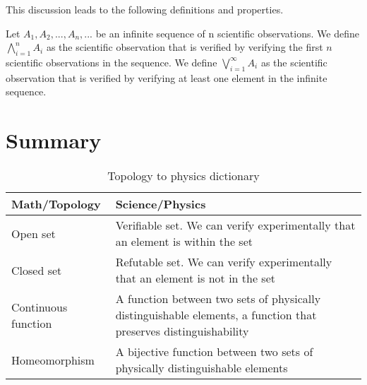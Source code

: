 \documentclass[11pt,letterpaper,fleqn]{memoir} %
\begin{document}
This discussion leads to the following definitions and properties.

\begin{defn}
	Let $A_1, A_2, ... , A_n, ...$ be an infinite sequence of n scientific observations. We define $\bigwedge\limits_{i=1}^{n} A_i$ as the scientific observation that is verified by verifying the first $n$ scientific observations in the sequence. We define $\bigvee\limits_{i=1}^{\infty} A_i$ as the scientific observation that is verified by verifying at least one element in the infinite sequence.
\end{defn}

\section{Summary}

\begin{table}[h]
	\centering
\begin{tabular}{p{} p{}}
	Math/Topology & Science/Physics \\ 
	\hline 
	Open set & Verifiable set. We can verify experimentally that an element is within the set  \\ 
	Closed set & Refutable set. We can verify experimentally that an element is not in the set \\ 
	Continuous \newline function &  A function between two sets of physically distinguishable elements, a function that preserves distinguishability \\
	Homeomorphism &  A bijective function between two sets of physically distinguishable elements \\
\end{tabular} 
	\caption{Topology to physics dictionary}
\end{table}

	
\end{document}
